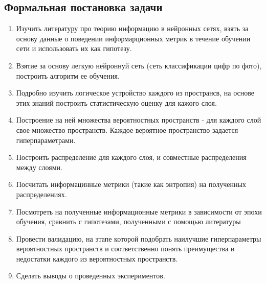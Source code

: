 \subsection{Формальная постановка задачи}
\begin{enumerate}
    \item Изучить литературу про теорию информацию в нейронных сетях, взять за основу данные о поведении информарционных метрик в течение обучении сети и использовать их как гипотезу.
    \item Взятие за основу легкую нейроннуй сеть (сеть классификации цифр по фото), построить алгоритм ее обучения.
    \item Подробно изучить логическое устройство каждого из пространсв, на основе этих знаний построить статистическую оценку для кажого слоя.
    \item Построение на ней множества вероятностных пространств - для каждого слой свое множество пространств. Каждое вероятное пространство задается гиперпараметрами.
    \item Построить распределение для каждого слоя, и совместные распределения между слоями.
    \item Посчитать информацинные метрики (такие как энтропия) на полученных распределениях.
    \item Посмотреть на полученные информационные метрики в зависимости от эпохи обучения, сравнить с гипотезами, полученными с помощью литературы
    \item Провести валидацию, на этапе которой подобрать наилучшие гиперпараметры вероятностных пространств и соответственно понять преимущества и недостатки каждого из вероятностных пространств.
    \item Сделать выводы о проведенных экспериментов.
\end{enumerate}